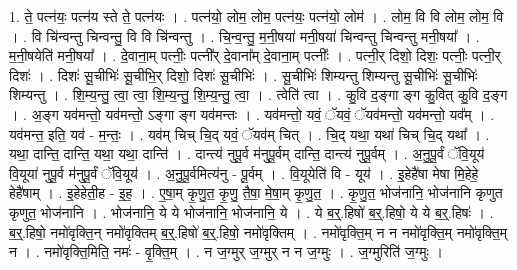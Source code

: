 \documentclass[17pt]{extarticle}
\begin{document}
1. ते॒ पत्न॑यः॒ पत्न॑य स्ते ते॒ पत्न॑यः । . पत्न॑यो॒ लोम॒ लोम॒ पत्न॑यः॒ पत्न॑यो॒ लोम॑ । . लोम॒ वि वि लोम॒ लोम॒ वि । . वि चि॑न्वन्तु चिन्वन्तु॒ वि वि चि॑न्वन्तु । . चि॒न्व॒न्तु॒ म॒नी॒षया॑ मनी॒षया॑ चिन्वन्तु चिन्वन्तु मनी॒षया᳚ । . म॒नी॒षयेति॑ मनी॒षया᳚ । . दे॒वाना॒म् पत्नीः॒ पत्नी᳚र् दे॒वाना᳚म् दे॒वाना॒म् पत्नीः᳚ । . पत्नी॒र् दिशो॒ दिशः॒ पत्नीः॒ पत्नी॒र् दिशः॑ । . दिशः॑ सू॒चीभिः॑ सू॒चीभि॒र् दिशो॒ दिशः॑ सू॒चीभिः॑ । . सू॒चीभिः॑ शिम्यन्तु शिम्यन्तु सू॒चीभिः॑ सू॒चीभिः॑ शिम्यन्तु । . शि॒म्य॒न्तु॒ त्वा॒ त्वा॒ शि॒म्य॒न्तु॒ शि॒म्य॒न्तु॒ त्वा॒ । . त्वेति॑ त्वा । . कु॒वि द॒ङ्गा ङ्ग कु॒वित् कु॒वि द॒ङ्ग । . अ॒ङ्ग यव॑मन्तो॒ यव॑मन्तो॒ ऽङ्गा ङ्ग यव॑मन्तः । . यव॑मन्तो॒ यवं॒ ॅयवं॒ ॅयव॑मन्तो॒ यव॑मन्तो॒ यव᳚म् । . यव॑मन्त॒ इति॒ यव॑ - म॒न्तः॒ । . यव॑म् चिच् चि॒द् यवं॒ ॅयव॑म् चित् । . चि॒द् यथा॒ यथा॑ चिच् चि॒द् यथा᳚ । . यथा॒ दान्ति॒ दान्ति॒ यथा॒ यथा॒ दान्ति॑ । . दान्त्य॑ नुपू॒र्व म॑नुपू॒र्वम् दान्ति॒ दान्त्य॑ नुपू॒र्वम् । . अ॒नु॒पू॒र्वं ॅवि॒यूय॑ वि॒यूया॑ नुपू॒र्व म॑नुपू॒र्वं ॅवि॒यूय॑ । . अ॒नु॒पू॒र्वमित्य॑नु - पू॒र्वम् । . वि॒यूयेति॑ वि - यूय॑ । . इ॒हेहै॑षा मेषा मि॒हेहे॒ हेहै॑षाम् । . इ॒हेहेती॒ह - इ॒ह॒ । . ए॒षा॒म् कृ॒णु॒त॒ कृ॒णु॒ तै॒षा॒ मे॒षा॒म् कृ॒णु॒त॒ । . कृ॒णु॒त॒ भोज॑नानि॒ भोज॑नानि कृणुत कृणुत॒ भोज॑नानि । . भोज॑नानि॒ ये ये भोज॑नानि॒ भोज॑नानि॒ ये । . ये ब॒र्॒.हिषो॑ ब॒र्॒.हिषो॒ ये ये ब॒र्॒.हिषः॑ । . ब॒र्॒.हिषो॒ नमो॑वृक्ति॒न् नमो॑वृक्तिम् ब॒र्॒.हिषो॑ ब॒र्॒.हिषो॒ नमो॑वृक्तिम् । . नमो॑वृक्ति॒म् न न नमो॑वृक्ति॒म् नमो॑वृक्ति॒म् न । . नमो॑वृक्ति॒मिति॒ नमः॑ - वृ॒क्ति॒म् । . न ज॒ग्मुर् ज॒ग्मुर् न न ज॒ग्मुः । . ज॒ग्मुरिति॑ ज॒ग्मुः । \newline
\end{document}
